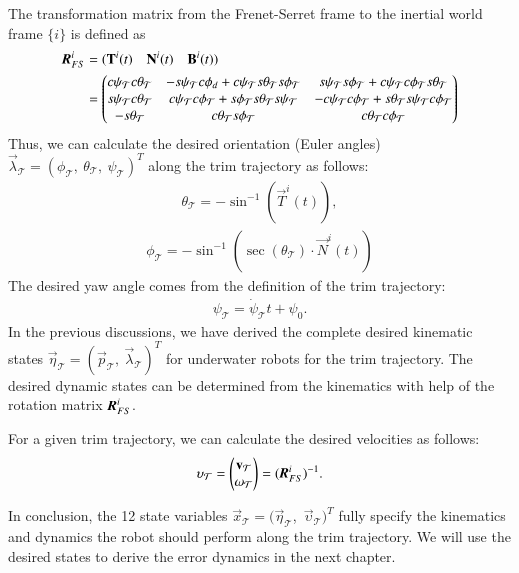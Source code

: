 The transformation matrix from the Frenet-Serret frame to the inertial world frame $\lbrace i \rbrace$ is defined as
\begin{align}
 \emph{\textbf{R}}_{FS}^{i} &=
 (\vec{T}^{i}(t) \quad \vec{N}^{i}(t) \quad \vec{B}^{i}(t)) \nonumber \\
 &=
 \begin{pmatrix}
c\psi_{\mathcal{T}} c\theta_{\mathcal{T}}&-s\psi_{\mathcal{T}} c\phi_{d}+c\psi_{\mathcal{T}} s\theta_{\mathcal{T}} s\phi_{\mathcal{T}}&s\psi_{\mathcal{T}} s\phi_{\mathcal{T}}+c\psi_{\mathcal{T}} c\phi_{\mathcal{T}} s\theta_{\mathcal{T}} \\
s\psi_{\mathcal{T}} c\theta_{\mathcal{T}}&c\psi_{\mathcal{T}} c\phi_{\mathcal{T}}+s\phi_{\mathcal{T}} s\theta_{\mathcal{T}} s\psi_{\mathcal{T}}&-c\psi_{\mathcal{T}} c\phi_{\mathcal{T}}+s\theta_{\mathcal{T}} s\psi_{\mathcal{T}} c\phi_{\mathcal{T}}\\
-s\theta_{\mathcal{T}}&c \theta_{\mathcal{T}} s \phi_{\mathcal{T}}&c \theta_{\mathcal{T}} c\phi_{\mathcal{T}}
\end{pmatrix}
\end{align}
Thus, we can calculate the desired orientation (Euler angles) $\vec{\lambda}_{\mathcal{T}}=(\phi_{\mathcal{T}},~\theta_{\mathcal{T}},
~\psi_{\mathcal{T}})^{T}$ along the trim trajectory as follows:
\begin{align}
\theta_{\mathcal{T}}=-\sin^{-1}(\vec{T}^{i}(t)),
\end{align}
\begin{align}
\phi_{\mathcal{T}}=-\sin^{-1}(\sec(\theta_{\mathcal{T}})\cdot \vec{N}^{i}(t))
\end{align}
The desired yaw angle comes from the definition of the trim trajectory:
\begin{align}
\psi_{\mathcal{T}}=\dot{\psi}_{\mathcal{T}}t+\psi_{0}.
\end{align}
In the previous discussions, we have derived the complete desired kinematic states $\vec{\eta}_{\mathcal{T}}=(\vec{p}_{\mathcal{T}},~\vec{\lambda}_{\mathcal{T}})^{T}$ for underwater robots for the trim trajectory. The desired dynamic states can be determined 
from the kinematics with help of the rotation  matrix $ \emph{\textbf{R}}_{FS}^{i}$.

For a given trim trajectory, we can calculate the desired velocities as follows:
\begin{align}
\vec{\upsilon}_{\mathcal{T}}=
\begin{pmatrix}
\vec{v}_{\mathcal{T}} \\
\vec{\omega}_{\mathcal{T}}
\end{pmatrix}=
(\emph{\textbf{R}}_{FS}^{i})^{-1}.
\end{align}

In conclusion, the 12 state variables $\vec{x}_{\mathcal{T}}=(\vec{\eta}_{\mathcal{T}}$,~$\vec{\upsilon}_{\mathcal{T}})^{T}$ fully specify the kinematics and dynamics the robot should perform along the trim trajectory. We will use the desired states to derive the error dynamics in the next chapter.


